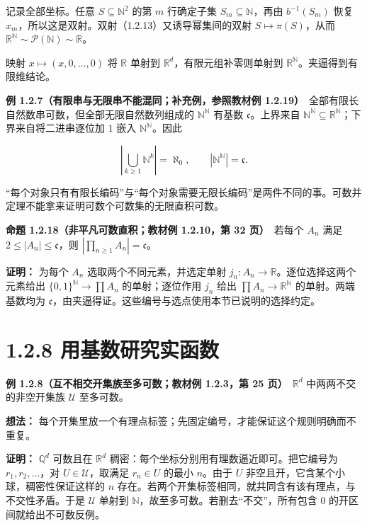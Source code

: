 \documentclass[11pt,a4paper]{article}
\begin{document}
记录全部坐标。任意 \(S\subseteq\mathbb N^2\) 的第 \(m\) 行确定子集
\(S_m\subseteq\mathbb N\)，再由 \(b^{-1}(S_m)\) 恢复
\(x_m\)，所以这是双射。双射（1.2.13）又诱导幂集间的双射
\(S\mapsto\pi(S)\)，从而
\(\mathbb R^{\mathbb N}\sim\mathcal P(\mathbb N)\sim\mathbb R\)。

映射 \(x\mapsto(x,0,\ldots,0)\) 将 \(\mathbb R\) 单射到
\(\mathbb R^d\)，有限元组补零则单射到
\(\mathbb R^{\mathbb N}\)。夹逼得到有限维结论。

\textbf{例 1.2.7（有限串与无限串不能混同；补充例，参照教材例
1.2.19）}　全部有限长自然数串可数，但全部无限自然数列组成的
\(\mathbb N^{\mathbb N}\) 有基数 \(\mathfrak c\)。上界来自
\(\mathbb N^{\mathbb N}\subseteq\mathbb R^{\mathbb N}\)；下界来自将二进串逐位加
\(1\) 嵌入 \(\mathbb N^{\mathbb N}\)。因此

\begin{equation*}
\left|\bigcup_{k\ge1}\mathbb N^k\right|=\aleph_0,
\qquad |\mathbb N^{\mathbb N}|=\mathfrak c.
\tag{1.2.21}
\end{equation*}

``每个对象只有有限长编码''与``每个对象需要无限长编码''是两件不同的事。可数并定理不能拿来证明可数个可数集的无限直积可数。

\textbf{命题 1.2.18（非平凡可数直积；教材例 1.2.10，第 32 页）}　若每个
\(A_n\) 满足 \(2\le|A_n|\le\mathfrak c\)，则
\(|\prod_{n\ge1}A_n|=\mathfrak c\)。

\textbf{证明：} 为每个 \(A_n\) 选取两个不同元素，并选定单射
\(j_n:A_n\to\mathbb R\)。逐位选择这两个元素给出
\(\{0,1\}^{\mathbb N}\to\prod A_n\) 的单射；逐位作用 \(j_n\) 给出
\(\prod A_n\to\mathbb R^{\mathbb N}\) 的单射。两端基数均为
\(\mathfrak c\)，由夹逼得证。这些编号与选点使用本节已说明的选择约定。

\section[\S{}1.2.8
用基数研究实函数]{1.2.8
用基数研究实函数}\label{ux7528ux57faux6570ux7814ux7a76ux5b9eux51fdux6570}

\textbf{例 1.2.8（互不相交开集族至多可数；教材例 1.2.3，第 25
页）}　\(\mathbb R^d\) 中两两不交的非空开集族 \(\mathcal U\) 至多可数。

\textbf{想法：}
每个开集里放一个有理点标签；先固定编号，才能保证这个规则明确而不重复。

\textbf{证明：} \(\mathbb Q^d\) 可数且在 \(\mathbb R^d\)
稠密：每个坐标分别用有理数逼近即可。把它编号为 \(r_1,r_2,\ldots\)，对
\(U\in\mathcal U\)，取满足 \(r_n\in U\) 的最小 \(n\)。由于 \(U\)
非空且开，它含某个小球，稠密性保证这样的 \(n\)
存在。若两个开集标签相同，就共同含有该有理点，与不交性矛盾。于是
\(\mathcal U\) 单射到
\(\mathbb N\)，故至多可数。若删去``不交''，所有包含 \(0\)
的开区间就给出不可数反例。
\end{document}
